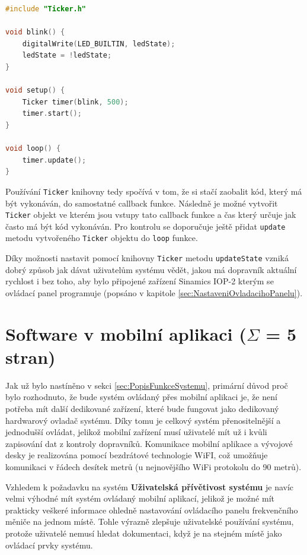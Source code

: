 \begin{lstlisting}[language=C++, caption={Způsob používání \texttt{Ticker} knihovny}, label={lst:TickerKnihovnaExample}]
#include "Ticker.h"

void blink() {
	digitalWrite(LED_BUILTIN, ledState);
	ledState = !ledState;
}

void setup() {
	Ticker timer(blink, 500);
	timer.start();
}

void loop() {
	timer.update();
}
\end{lstlisting}

Používání \texttt{Ticker} knihovny tedy spočívá v tom, že si stačí zaobalit kód, který má být vykonáván, do samostatné callback funkce. Následně je možné vytvořit \texttt{Ticker} objekt ve kterém jsou vstupy tato callback funkce a čas který určuje jak často má být kód vykonáván. Pro kontrolu se doporučuje ještě přidat \texttt{update} metodu vytvořeného \texttt{Ticker} objektu do \texttt{loop} funkce.

Díky možnosti nastavit pomocí knihovny \texttt{Ticker} metodu \texttt{updateState} vzniká dobrý způsob jak dávat uživatelům systému vědět, jakou má dopravník aktuální rychlost i bez toho, aby bylo připojené zařízení Sinamics IOP-2 kterým se ovládací panel programuje (popsáno v kapitole \ref{sec:NastaveniOvladacihoPanelu}).

\section{Software v mobilní aplikaci ($\Sigma$ = 5 stran)}\label{sec:SoftwareVMobilniAplikaci}

Jak už bylo nastíněno v sekci \ref{sec:PopisFunkceSystemu}, primární důvod proč bylo rozhodnuto, že bude systém ovládaný přes mobilní aplikaci je, že není potřeba mít další dedikované zařízení, které bude fungovat jako dedikovaný hardwarový ovladač systému. Díky tomu je celkový systém přenositelnější a jednodušší ovládat, jelikož mobilní zařízení musí uživatelé mít už i kvůli zapisování dat z kontroly dopravníků. Komunikace mobilní aplikace a vývojové desky je realizována pomocí bezdrátové technologie WiFI, což umožňuje komunikaci v řádech desítek metrů (u nejnovějšího WiFi protokolu do 90 metrů).
\cite{DosahWIFIProtokolu}

Vzhledem k požadavku na systém \textbf{Uživatelská přívětivost systému} je navíc velmi výhodné mít systém ovládaný mobilní aplikací, jelikož je možné mít prakticky veškeré informace ohledně nastavování ovládacího panelu frekvenčního měniče na jednom místě. Tohle výrazně zlepšuje uživatelské používání systému, protože uživatelé nemusí hledat dokumentaci, když je na stejném místě jako ovládací prvky systému.

